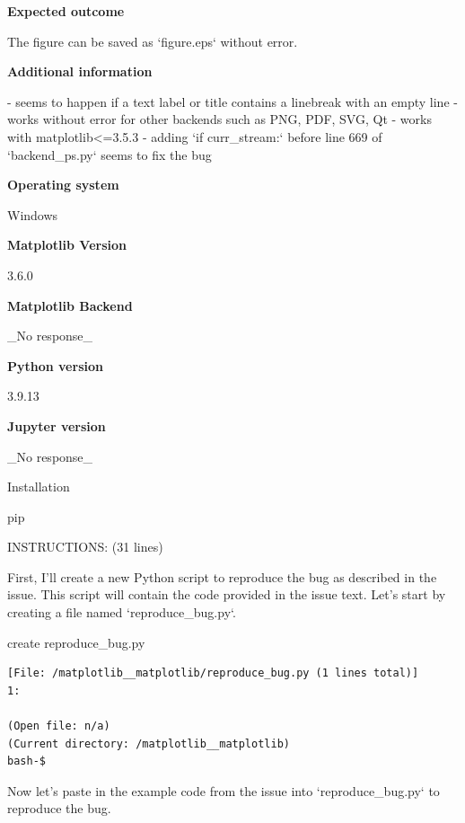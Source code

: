 {\begin{issuebox}
{\large \textbf{Expected outcome}}

The figure can be saved as `figure.eps` without error.

{\large \textbf{Additional information}}

- seems to happen if a text label or title contains a linebreak with an empty line
- works without error for other backends such as PNG, PDF, SVG, Qt
- works with matplotlib<=3.5.3
- adding `if curr\_stream:` before line 669 of `backend\_ps.py` seems to fix the bug 

{\large \textbf{Operating system}}

Windows

{\large \textbf{Matplotlib Version}}

3.6.0

{\large \textbf{Matplotlib Backend}}

\_No response\_

{\large \textbf{Python version}}

3.9.13

{\large \textbf{Jupyter version}}

\_No response\_

{\textbf\large Installation}

pip

INSTRUCTIONS: (31 lines)


\end{issuebox}
\begin{agentbox}
First, I'll create a new Python script to reproduce the bug as described in the issue. This script will contain the code provided in the issue text. Let's start by creating a file named `reproduce\_bug.py`.

\hrulefill
\begin{CodeVerbatim}[breaklines=true, breakanywhere=true]
create reproduce_bug.py
\end{CodeVerbatim}
\end{agentbox}
\begin{observationbox}\begin{Verbatim}[breaklines=true, breakanywhere=true]
[File: /matplotlib__matplotlib/reproduce_bug.py (1 lines total)]
1:

(Open file: n/a)
(Current directory: /matplotlib__matplotlib)
bash-$
\end{Verbatim}
\end{observationbox}
\begin{agentbox}
Now let's paste in the example code from the issue into `reproduce\_bug.py` to reproduce the bug.


\end{agentbox}}
